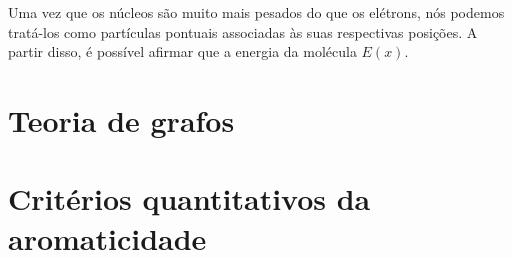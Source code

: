 Uma vez que os núcleos são muito mais pesados do que os elétrons, nós podemos tratá-los como partículas pontuais associadas às suas respectivas posições. A partir disso, é possível afirmar que a energia da molécula $E(x)$.

\section{Teoria de grafos}

\section{Critérios quantitativos da aromaticidade}